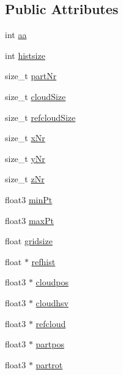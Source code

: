 \subsection*{\-Public \-Attributes}
\begin{DoxyCompactItemize}
\item 
int \hyperlink{class_c_s_g_p_u_a8b544902a5b4fe5f7e010dda96ce7e93}{aa}
\item 
int \hyperlink{class_c_s_g_p_u_ace2257bc4c7eb29735ee01c03b7a7471}{histsize}
\item 
size\-\_\-t \hyperlink{class_c_s_g_p_u_a70716430b4cdd6085222556ef8ef2fb0}{part\-Nr}
\item 
size\-\_\-t \hyperlink{class_c_s_g_p_u_a3e3845d161dfaf5087e1a9329f0795cb}{cloud\-Size}
\item 
size\-\_\-t \hyperlink{class_c_s_g_p_u_aca9cc9e5ae863e7395d053ad724184da}{refcloud\-Size}
\item 
size\-\_\-t \hyperlink{class_c_s_g_p_u_a8f232965ca3bfd56b6d96ea5b9d92a57}{x\-Nr}
\item 
size\-\_\-t \hyperlink{class_c_s_g_p_u_a432972a16b011b3f0733b0e88185d8c9}{y\-Nr}
\item 
size\-\_\-t \hyperlink{class_c_s_g_p_u_a628e566c47edc244f4ced4ea8fdff40c}{z\-Nr}
\item 
float3 \hyperlink{class_c_s_g_p_u_a546cfd9fd17e125e8c1c7530b0783057}{min\-Pt}
\item 
float3 \hyperlink{class_c_s_g_p_u_a43d5d65a62bdd4c0529a7c5597526573}{max\-Pt}
\item 
float \hyperlink{class_c_s_g_p_u_a819ee6c0a3e2733e3edc350f9e090d39}{gridsize}
\item 
float $\ast$ \hyperlink{class_c_s_g_p_u_a8f0488218cd59487bb4900c066e5e250}{refhist}
\item 
float3 $\ast$ \hyperlink{class_c_s_g_p_u_aae0654f6af8886eeef6a455efbc1e1ed}{cloudpos}
\item 
float3 $\ast$ \hyperlink{class_c_s_g_p_u_a16a0b4b64cd6b658b618ddab15e4106a}{cloudhsv}
\item 
float3 $\ast$ \hyperlink{class_c_s_g_p_u_a6342a509f62d97d425b4759804872107}{refcloud}
\item 
float3 $\ast$ \hyperlink{class_c_s_g_p_u_aa654de3881bb51f6d9f461955976ac00}{partpos}
\item 
float3 $\ast$ \hyperlink{class_c_s_g_p_u_a832b559fdd18b22c2705d4ffa5c0d93d}{partrot}
\end{DoxyCompactItemize}


